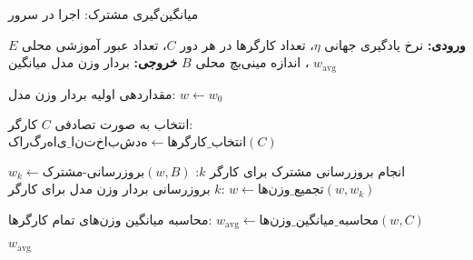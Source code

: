 \begin{algorithm}[tbp]
    \caption{میانگین‌گیری مشترک: اجرا در سرور}
    \label{alg:federated_averaging}
    \begin{algorithmic}[1]
        \State \textbf{ورودی:} نرخ یادگیری جهانی $\eta$، تعداد کارگر‌ها در هر دور $C$، تعداد عبور آموزشی محلی $E$، اندازه مینی‌بچ محلی $B$
        \State \textbf{خروجی:} بردار وزن مدل میانگین $w_{\text{avg}}$
        
            \State مقداردهی اولیه بردار وزن مدل: $w \gets w_0$
            
             
                \State انتخاب به صورت تصادفی $C$ کارگر: $کارگر‌های\_انتخاب‌شده \gets \text{انتخاب\_کارگر‌ها}(C)$
                
                    \State انجام بروزرسانی مشترک برای کارگر $k$: $w_k \gets \text{بروزرسانی-مشترک}(w, B)$
                    \State بروزرسانی بردار وزن مدل برای کارگر $k$: $w \gets \text{تجمیع\_وزن‌ها}(w, w_k)$
                \EndFor
                
                \State محاسبه میانگین وزن‌های تمام کارگر‌ها: $w_{\text{avg}} \gets \text{محاسبه\_میانگین\_وزن‌ها}(w, C)$
            \EndFor
            
            \State \Return $w_{\text{avg}}$
        \EndFunction
    \end{algorithmic}
\end{algorithm}

